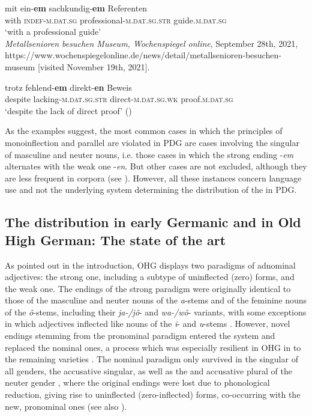 \documentclass[output=paper,colorlinks,citecolor=brown]{langscibook}
\begin{document}
\begin{exe}
\ex\label{ch6ex5}
\gll mit ein-\textbf{em} sachkundig-\textbf{em} Referenten\\
with \textsc{indef-m.dat.sg} professional-\textsc{m.dat.sg.str} guide.\textsc{m.dat.sg}\\
\glt `with a professional guide' \\ \emph{Metallsenioren besuchen Museum, Wochenspiegel online}, September
28th, 2021,
https://www.wochenspiegelonline.de/news/detail/metallsenioren-besuchen-museum
{[}visited November 19th, 2021{]}.
\end{exe}

\begin{exe}
\ex\label{ch6ex6}
\gll trotz fehlend-\textbf{em} direkt-\textbf{en} Beweis\\
despite lacking-\textsc{m.dat.sg.str} direct-\textsc{m.dat.sg.wk} proof.\textsc{m.dat.sg}\\
\glt `despite the lack of direct proof' (\cite[296, ex. (2)]{Bildhauer2019})
\end{exe}

As the examples suggest, the most common cases in which the principles
of monoinflection and parallel  are violated in PDG are cases
involving the  singular of masculine and neuter nouns, i.e. those
cases in which the strong ending -\emph{em} alternates with the weak one
-\emph{en}. But other cases are not excluded, although they are less
frequent in corpora (see \citealp{Niebuhr21}). However, all these instances
concern language use and not the underlying system determining the
distribution of the  in PDG.

\subsection{The distribution in early Germanic and in Old High German: The state of the art}\label{sec:distrEGOHG}
As pointed out in the introduction, OHG displays two paradigms of
adnominal adjectives: the strong one, including a subtype of uninflected
(zero) forms, and the weak one. The endings of the strong paradigm were
originally identical to those of the masculine and neuter nouns of the
\emph{a}-stems and of the feminine nouns of the \emph{ô}-stems,
including their \emph{ja-/jô}- and \emph{wa-/wô}- variants, with some
exceptions in which adjectives inflected like nouns of the \emph{i}- and
\emph{u}-stems \citep[289]{Braune2018AHD}. However, novel endings stemming from
the pronominal paradigm entered the system and replaced the nominal
ones, a process which was especially resilient in OHG in  to the
remaining  varieties \citep[194--195]{klein2007semantischen}. The nominal
paradigm only survived in the  singular of all genders, the
accusative singular, as well as the  and accusative plural of
the neuter gender \citep[170]{behaghel1923deutsche}, where the original endings were
lost due to phonological reduction, giving rise to uninflected
(zero-inflected) forms, co-occurring with the new, pronominal ones (see
also \citealp[441, 733]{Wilmanns09}).
\end{document}
